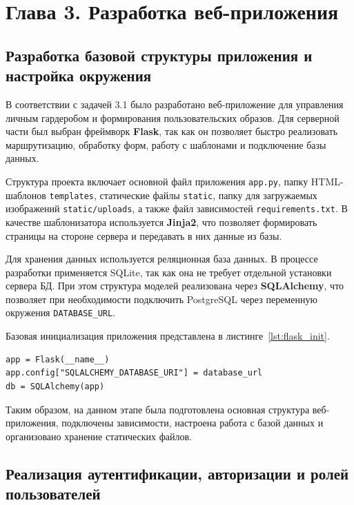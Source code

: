 \section*{Глава 3. Разработка веб-приложения}

\subsection{Разработка базовой структуры приложения и настройка окружения}

В соответствии с задачей 3.1 было разработано веб-приложение для управления личным гардеробом и формирования пользовательских образов. Для серверной части был выбран фреймворк \textbf{Flask}, так как он позволяет быстро реализовать маршрутизацию, обработку форм, работу с шаблонами и подключение базы данных.

Структура проекта включает основной файл приложения \texttt{app.py}, папку HTML-шаблонов \texttt{templates}, статические файлы \texttt{static}, папку для загружаемых изображений \texttt{static/uploads}, а также файл зависимостей \texttt{requirements.txt}. В качестве шаблонизатора используется \textbf{Jinja2}, что позволяет формировать страницы на стороне сервера и передавать в них данные из базы.

Для хранения данных используется реляционная база данных. В процессе разработки применяется SQLite, так как она не требует отдельной установки сервера БД. При этом структура моделей реализована через \textbf{SQLAlchemy}, что позволяет при необходимости подключить PostgreSQL через переменную окружения \texttt{DATABASE\_URL}.

Базовая инициализация приложения представлена в листинге~\ref{lst:flask_init}.

\begin{lstlisting}[caption={Инициализация Flask-приложения}, label={lst:flask_init}]
app = Flask(__name__)
app.config["SQLALCHEMY_DATABASE_URI"] = database_url
db = SQLAlchemy(app)
\end{lstlisting}

Таким образом, на данном этапе была подготовлена основная структура веб-приложения, подключены зависимости, настроена работа с базой данных и организовано хранение статических файлов.

\subsection{Реализация аутентификации, авторизации и ролей пользователей}

